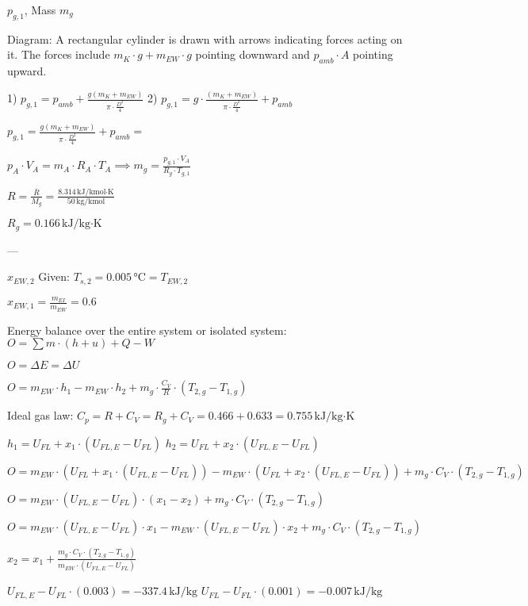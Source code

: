 \( p_{g,1} \), Mass \( m_g \)  

Diagram: A rectangular cylinder is drawn with arrows indicating forces acting on it. The forces include \( m_K \cdot g + m_{EW} \cdot g \) pointing downward and \( p_{amb} \cdot A \) pointing upward.  

1) \( p_{g,1} = p_{amb} + \frac{g (m_K + m_{EW})}{\pi \cdot \frac{D^2}{4}} \)  
2) \( p_{g,1} = g \cdot \frac{(m_K + m_{EW})}{\pi \cdot \frac{D^2}{4}} + p_{amb} \)  

\( p_{g,1} = \frac{g (m_K + m_{EW})}{\pi \cdot \frac{D^2}{4}} + p_{amb} = \)  

\( p_A \cdot V_A = m_A \cdot R_A \cdot T_A \implies m_g = \frac{p_{g,1} \cdot V_A}{R_g \cdot T_{g,1}} \)  

\( R = \frac{\overline{R}}{M_g} = \frac{8.314 \, \text{kJ/kmol·K}}{50 \, \text{kg/kmol}} \)  

\( R_g = 0.166 \, \text{kJ/kg·K} \)  

---

\( x_{EW,2} \)  
Given: \( T_{s,2} = 0.005 \, \text{°C} = T_{EW,2} \)  

\( x_{EW,1} = \frac{m_{EI}}{m_{EW}} = 0.6 \)  

Energy balance over the entire system or isolated system:  
\( O = \sum m \cdot (h + u) + Q - W \)  

\( O = \Delta E = \Delta U \)  

\( O = m_{EW} \cdot h_1 - m_{EW} \cdot h_2 + m_g \cdot \frac{C_V}{R} \cdot (T_{2,g} - T_{1,g}) \)  

Ideal gas law:  
\( C_p = R + C_V = R_g + C_V = 0.466 + 0.633 = 0.755 \, \text{kJ/kg·K} \)  

\( h_1 = U_{FL} + x_1 \cdot (U_{FL,E} - U_{FL}) \)  
\( h_2 = U_{FL} + x_2 \cdot (U_{FL,E} - U_{FL}) \)  

\( O = m_{EW} \cdot (U_{FL} + x_1 \cdot (U_{FL,E} - U_{FL})) - m_{EW} \cdot (U_{FL} + x_2 \cdot (U_{FL,E} - U_{FL})) + m_g \cdot C_V \cdot (T_{2,g} - T_{1,g}) \)  

\( O = m_{EW} \cdot (U_{FL,E} - U_{FL}) \cdot (x_1 - x_2) + m_g \cdot C_V \cdot (T_{2,g} - T_{1,g}) \)  

\( O = m_{EW} \cdot (U_{FL,E} - U_{FL}) \cdot x_1 - m_{EW} \cdot (U_{FL,E} - U_{FL}) \cdot x_2 + m_g \cdot C_V \cdot (T_{2,g} - T_{1,g}) \)  

\( x_2 = x_1 + \frac{m_g \cdot C_V \cdot (T_{2,g} - T_{1,g})}{m_{EW} \cdot (U_{FL,E} - U_{FL})} \)  

\( U_{FL,E} - U_{FL} \cdot (0.003) = -337.4 \, \text{kJ/kg} \)  
\( U_{FL} - U_{FL} \cdot (0.001) = -0.007 \, \text{kJ/kg} \)